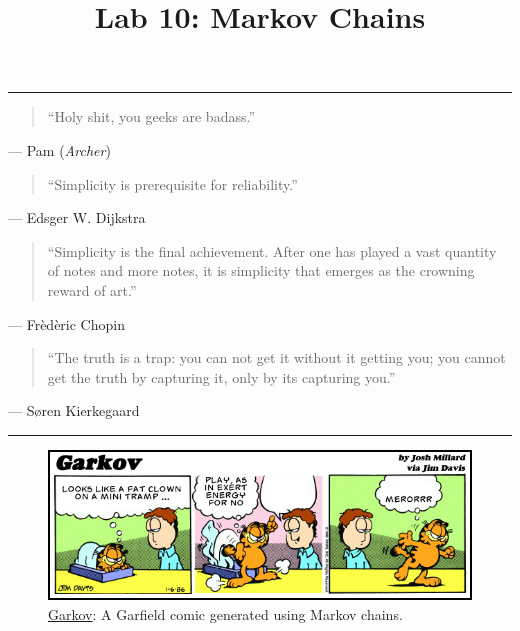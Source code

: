 \documentclass[11pt]{cselabheader}
\title{Lab 10: Markov Chains}
\begin{document}
\maketitle

\hrule
\begin{quotation}
``Holy shit, you geeks are badass.''
\end{quotation}
\begin{flushright}
  --- Pam (\emph{Archer})
\end{flushright}


\begin{quotation}
``Simplicity is prerequisite for reliability.''
\end{quotation}
\begin{flushright}
--- Edsger W. Dijkstra
\end{flushright}

\begin{quotation}
``Simplicity is the final achievement. After one has played a vast quantity of
notes and more notes, it is simplicity that emerges as the crowning reward of
art.''
\end{quotation}
\begin{flushright}
--- Fr\`ed\`eric Chopin
\end{flushright}

\begin{quotation}
``The truth is a trap: you can not get it without it getting you; you cannot get
the truth by capturing it, only by its capturing you.''
\end{quotation}
\begin{flushright}
--- S{\o}ren Kierkegaard
\end{flushright}

\hrule

\begin{figure}[!ht]
  \centering
  \includegraphics[width=\linewidth]{img/garkov}
  \caption*{\href{http://joshmillard.com/garkov/}{Garkov}:
    A Garfield comic generated using Markov chains.}
  \label{garkov}
\end{figure}
\end{document}
